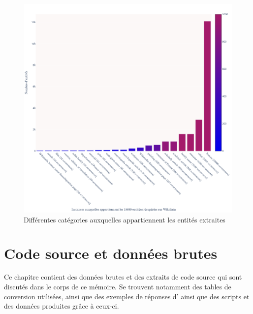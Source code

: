\begin{figure}
	\centering
	\includegraphics[width=\linewidth]{annexes/fig_wikidata_instances.png}
	\caption{Différentes catégories auxquelles appartiennent les entités \wkd{} extraites}
	\label{appendix:wikidata_instances}
\end{figure}

\chapter{Code source et données brutes}
Ce chapitre contient des données brutes et des extraits de code source qui sont discutés dans le corps de ce mémoire. Se trouvent notamment des tables de conversion utilisées, ainsi que des exemples de réponses d'\api{} ainsi que des scripts \py{} et des données produites grâce à ceux-ci.

